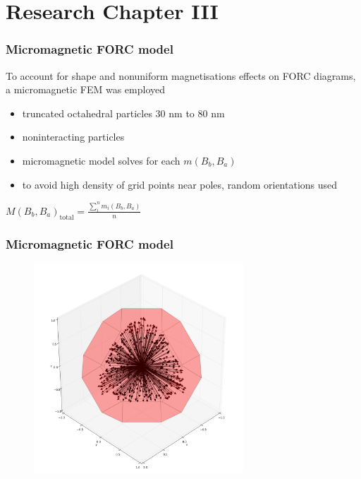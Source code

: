 \documentclass{beamer}
\begin{document}
        \section{Research Chapter III}
        \begin{frame}
          \frametitle{Micromagnetic FORC model}
          To account for shape and nonuniform magnetisations effects on FORC diagrams, a micromagnetic FEM was employed
          \begin{itemize}
            \item truncated octahedral particles 30 nm to 80 nm
            \item noninteracting particles
            \item micromagnetic model solves for each $m(B_b, B_a)$
            \item to avoid high density of grid points near poles, random orientations used
          \end{itemize}
          \vspace{2mm} \center \Large $\textit{M}(\textit{B}_{\textit{b}}, \textit{B}_{\textit{a}})_{\text{total}} = \frac{\sum_{\textit{i}}^{\textit{n}}\textit{m}_{\textit{i}}(\textit{B}_{\textit{b}}, \textit{B}_{\textit{a}})}{\textit{n}}$
        \end{frame}

        \begin{frame}
          \frametitle{Micromagnetic FORC model}
          \begin{figure}[htb]
            \centering
            \includegraphics[width=0.7\textwidth]{Chapter_03_Figure_01.pdf}
          \end{figure}
        \end{frame}
\end{document}
